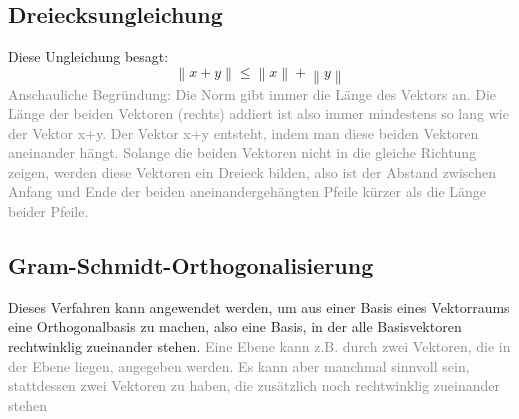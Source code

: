 \documentclass{report}
\begin{document}
		\subsection{Dreiecksungleichung}
			Diese Ungleichung besagt:
			\begin{equation}
				\left\lVert x+y \right\rVert \leq \left\lVert x \right\rVert + \left\lVert y \right\rVert
			\end{equation}
			\textcolor{gray}{Anschauliche Begründung: Die Norm gibt immer die Länge des Vektors an. Die Länge der beiden Vektoren (rechts) addiert ist also immer mindestens so lang wie der Vektor x+y. Der Vektor x+y entsteht, indem man diese beiden Vektoren aneinander hängt. Solange die beiden Vektoren nicht in die gleiche Richtung zeigen, werden diese Vektoren ein Dreieck bilden, also ist der Abstand zwischen Anfang und Ende der beiden aneinandergehängten Pfeile  kürzer als die Länge beider Pfeile.}
		\subsection{Gram-Schmidt-Orthogonalisierung}
			Dieses Verfahren kann angewendet werden, um aus einer Basis eines Vektorraums eine Orthogonalbasis zu machen, also eine Basis, in der alle Basisvektoren rechtwinklig zueinander stehen. 
			\textcolor{gray}{Eine Ebene kann z.B. durch zwei Vektoren, die in der Ebene liegen, angegeben werden. Es kann aber manchmal sinnvoll sein, stattdessen zwei Vektoren zu haben, die zusätzlich noch rechtwinklig zueinander stehen}
\end{document}
